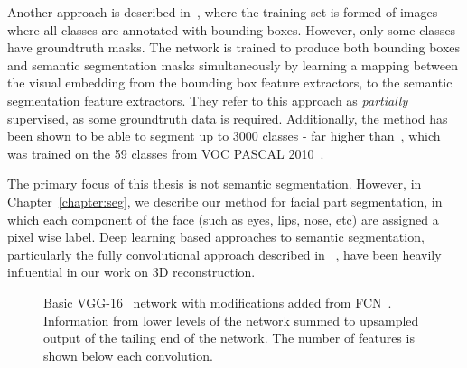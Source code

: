 Another approach is described in~\cite{hu2018learning}, where the
training set is formed of images where all classes are annotated with
bounding boxes. However, only some classes have groundtruth masks. The
network is trained to produce both bounding boxes and semantic
segmentation masks simultaneously by learning a mapping between the
visual embedding from the bounding box feature extractors, to the
semantic segmentation feature extractors. They refer to this approach
as \textit{partially} supervised, as some groundtruth data is
required. Additionally, the method has been shown to be able to
segment up to 3000 classes - far higher than~\cite{long2015fully},
which was trained on the 59 classes from VOC PASCAL
2010~\cite{everingham2010pascal}.

The primary focus of this thesis is not semantic
segmentation. However, in Chapter~\ref{chapter:seg}, we describe our
method for facial part segmentation, in which each component of the
face (such as eyes, lips, nose, etc) are assigned a pixel wise
label. Deep learning based approaches to semantic segmentation,
particularly the fully convolutional approach described in
~\cite{long2015fully}, have been heavily influential in our work on 3D
reconstruction.

\begin{figure}
  \centering
\caption[The VGG-16 network]{Basic VGG-16~\cite{simonyan2014vgg}
  network with modifications added from
  FCN~\cite{long2015fully}. Information from lower levels of the
  network summed to upsampled output of the tailing end of the
  network. The number of features is shown below each convolution.}
\label{fig:background:fcn}
\end{figure}

